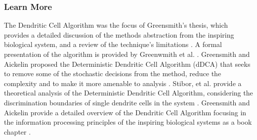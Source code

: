 % 
% 
\subsubsection{Learn More}
The Dendritic Cell Algorithm was the focus of Greensmith's thesis, which provides a detailed discussion of the methods abstraction from the inspiring biological system, and a review of the technique's limitations \cite{Greensmith2007}. 
A formal presentation of the algorithm is provided by Greenwmith et al. \cite{Greensmith2006a}.
Greensmith and Aickelin proposed the Deterministic Dendritic Cell Algorithm (dDCA) that seeks to remove some of the stochastic decisions from the method, reduce the complexity and to make it more amenable to analysis \cite{Greensmith2008}.
Stibor, et al. provide a theoretical analysis of the Deterministic Dendritic Cell Algorithm, considering the discrimination boundaries of single dendrite cells in the system \cite{Stibor2009}. 
Greensmith and Aickelin provide a detailed overview of the Dendritic Cell Algorithm focusing in the information processing principles of the inspiring biological systems as a book chapter \cite{Greensmith2009}.



